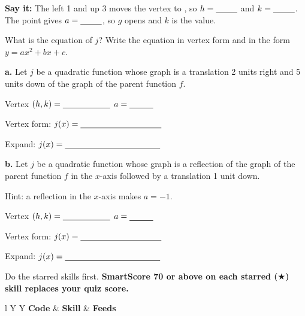 \textbf{Say it:} The \blank[2.4cm] left 1 and up 3 moves the vertex to \blank[1.6cm], so $h=\blank[0.9cm]$ and $k=\blank[0.9cm]$. The point \blank[1.6cm] gives $a=\blank[0.9cm]$, so $g$ opens \blank[2cm] and $k$ is the \blank[2.2cm] value.

What is the equation of $j$? Write the equation in vertex form and in the form $y=ax^2+bx+c$.

\begin{minipage}[t]{0.48\textwidth}
\vspace{0pt}
\textbf{a.} Let $j$ be a quadratic function whose graph is a translation 2 units right and 5 units down of the graph of the parent function $f$.

\vspace{4pt}
Vertex $(h,k)=\blank[2cm]$ \quad $a=\blank[1cm]$

Vertex form: $j(x)=\blank[3.4cm]$

Expand:
\lines[3]
$j(x)=\blank[4cm]$
\end{minipage}\hfill
\begin{minipage}[t]{0.48\textwidth}
\vspace{0pt}
\textbf{b.} Let $j$ be a quadratic function whose graph is a reflection of the graph of the parent function $f$ in the $x$-axis followed by a translation 1 unit down.

Hint: a reflection in the $x$-axis makes $a=-1$.

\vspace{4pt}
Vertex $(h,k)=\blank[2cm]$ \quad $a=\blank[1cm]$

Vertex form: $j(x)=\blank[3.4cm]$

Expand:
\lines[3]
$j(x)=\blank[4cm]$
\end{minipage}

Do the starred skills first. \textbf{SmartScore 70 or above on each starred ($\bigstar$) skill replaces your quiz score.}

\vspace{2pt}
\begin{tabularx}{\textwidth}{l Y Y}
\toprule
\textbf{Code} & \textbf{Skill} & \textbf{Feeds} \\
\midrule
{}
\bottomrule
\end{tabularx}

